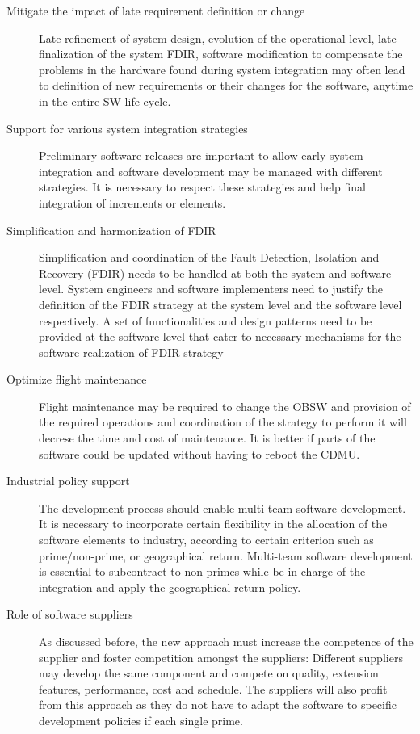 \begin{description}
\item [Mitigate the impact of late requirement definition or change] Late refinement of system design, evolution of the operational level, late finalization of the system FDIR, software modification to compensate the problems in the hardware found during system integration may often lead to definition of new requirements or their changes for the software, anytime in the entire SW life-cycle.
\item [Support for various system integration strategies] Preliminary software releases are important to allow early system integration and software development may be managed with different strategies. It is necessary to respect these strategies and help final integration of increments or elements.
\item [Simplification and harmonization of FDIR] Simplification and coordination of the Fault Detection, Isolation and Recovery (FDIR) needs to be handled at both the system and software level. System engineers and software implementers need to justify the definition of the FDIR strategy at the system level and the software level respectively. A set of functionalities and design patterns need to be provided at the software level that cater to necessary mechanisms for the software realization of FDIR strategy
\item [Optimize flight maintenance] Flight maintenance may be required to change the OBSW and provision of the required operations and coordination of the strategy to perform it will decrese the time and cost of maintenance. It is better if parts of the software could be updated without having to reboot the CDMU. 
\item [Industrial policy support] The development process should enable multi-team software development. It is necessary to incorporate certain flexibility in the allocation of the software elements to industry, according to certain criterion such as prime/non-prime, or geographical return. Multi-team software development is essential to subcontract to non-primes while be in charge of the integration and apply the geographical return policy.
\item [Role of software suppliers] As discussed before, the new approach must increase the competence of the supplier and foster competition amongst the suppliers: Different suppliers may develop the same component and compete on quality, extension features, performance, cost and schedule. The suppliers will also profit from this approach as they do not have to adapt the software to specific development policies if each single prime.

\end{description}
